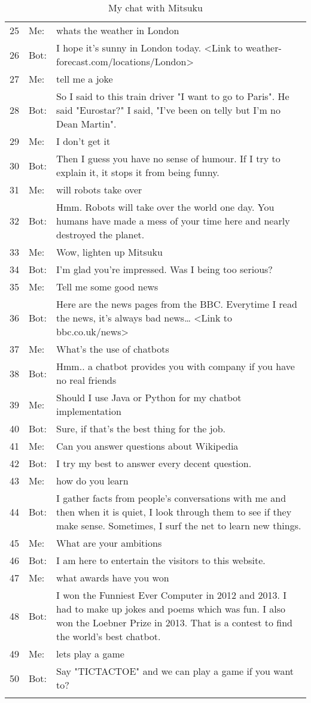 \begin{longtable}{@{}p{} p{}  p{}@{}}
	25 & Me: & whats the weather in London \\ 
	26 & Bot: & I hope it's sunny in London today. <Link to weather-forecast.com/locations/London> \\ 
	27 & Me: & tell me a joke \\ 
	28 & Bot: & So I said to this train driver "I want to go to Paris". He said "Eurostar?" I said, "I've been on telly but I'm no Dean Martin". \\ 
	29 & Me: & I don't get it \\ 
	30 & Bot: & Then I guess you have no sense of humour. If I try to explain it, it stops it from being funny. \\ 
	31 & Me: & will robots take over \\ 
	32 & Bot: & Hmm. Robots will take over the world one day. You humans have made a mess of your time here and nearly destroyed the planet. \\ 
	33 & Me: & Wow, lighten up Mitsuku \\ 
	34 & Bot: & I'm glad you're impressed. Was I being too serious? \\ 
	35 & Me: & Tell me some good news \\ 
	36 & Bot: & Here are the news pages from the BBC. Everytime I read the news, it's always bad news… <Link to bbc.co.uk/news> \\ 
	37 & Me: & What's the use of chatbots \\ 
	38 & Bot: & Hmm.. a chatbot provides you with company if you have no real friends \\ 
	39 & Me: & Should I use Java or Python for my chatbot implementation \\ 
	40 & Bot: & Sure, if that's the best thing for the job. \\ 
	41 & Me: & Can you answer questions about Wikipedia \\ 
	42 & Bot: & I try my best to answer every decent question. \\ 
	43 & Me: & how do you learn \\ 
	44 & Bot: & I gather facts from people's conversations with me and then when it is quiet, I look through them to see if they make sense. Sometimes, I surf the net to learn new things. \\ 
	45 & Me: & What are your ambitions \\ 
	46 & Bot: & I am here to entertain the visitors to this website. \\ 
	47 & Me: & what awards have you won \\ 
	48 & Bot: & I won the Funniest Ever Computer in 2012 and 2013. I had to make up jokes and poems which was fun. I also won the Loebner Prize in 2013. That is a contest to find the world's best chatbot. \\ 
	49 & Me: & lets play a game \\ 
	50 & Bot: & Say "TICTACTOE" and we can play a game if you want to? \\ 
	\bottomrule
	\caption{My chat with Mitsuku}
\end{longtable}

